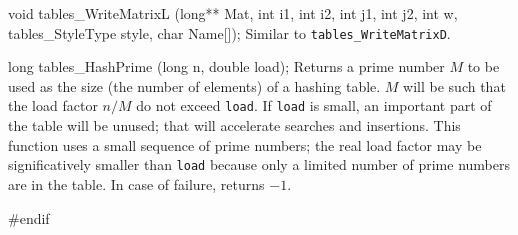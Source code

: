 void tables_WriteMatrixL (long** Mat, int i1, int i2, int j1, int j2, int w,
                          tables_StyleType style, char Name[]);
\endcode
 \tab Similar to {\tt tables\_WriteMatrixD}.
 \endtab
\code


long tables_HashPrime (long n, double load);
\endcode
  \tab Returns a prime number $M$ to be used as the size
   (the number of elements) of a hashing table.
   $M$ will be such that the load factor $n/M$ do not exceed {\tt load}.
   If {\tt load} is small, an important part of the table will be unused; that
   will accelerate searches and insertions.
   This function uses a small sequence of prime numbers; the real load factor
   may be significatively smaller than {\tt load} because only a limited
   number of prime numbers are in the table. In case of failure, returns $-1$.
 \endtab
\code\hide

#endif
\endhide
\endcode
